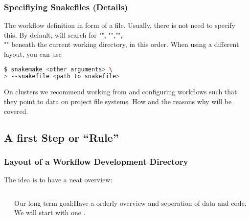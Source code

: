 \begin{frame}[fragile]
	\frametitle{Specifiying Snakefiles (Details)}
	\begin{docs}
		The workflow definition in form of a file. Usually, there is not need to specify this. By default, \Snakemake{} will search for "", "","", \\"" beneath the current working directory, in this order.\newline
		When using a different layout, you can use
		\begin{lstlisting}[language=Bash, style=Shell]
$ snakemake <other arguments> \
> --snakefile <path to snakefile>
		\end{lstlisting}
	\end{docs}
	\pause
	\begin{hint}
		On clusters we recommend working from  and configuring workflows such that they point to data on project file systems. How and the reasons why will be covered.
	\end{hint}
\end{frame}


\subsection{A first Step or ``Rule''}

\begin{frame}[fragile]
  \frametitle{Layout of a Workflow Development Directory} 
  The idea is to have a neat overview:
  \begin{columns}
    \begin{column}{0.5\textwidth}
      
  \begin{minipage}[t]{0.5\textwidth}
            {\tiny \DTsetlength{0.2em}{1em}{0.2em}{0.4pt}{.6pt}
}
    \end{minipage}
    \end{column}
    \begin{column}{0.5\textwidth}
      \begin{hint}
      	Our long term goal:\newline Have a orderly overview and seperation of data and code. We will start with one .
      \end{hint}
    \end{column}
  \end{columns}
\end{frame}


